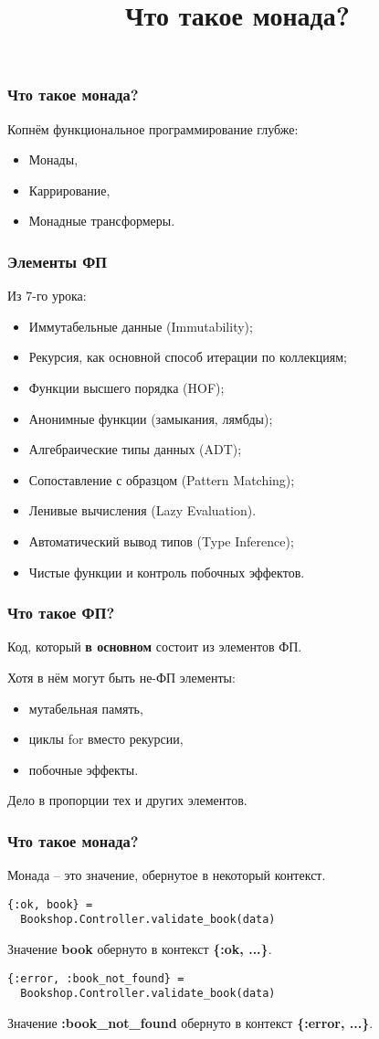 \documentclass[10pt]{beamer}
\title{Что такое монада?}
\begin{document}
\begin{frame}
  \frametitle{Что такое монада?}
  Копнём функциональное программирование глубже:
  \par \bigskip
  \begin{itemize}
  \item Монады,
  \item Каррирование,
  \item Монадные трансформеры.
  \end{itemize}
\end{frame}

\begin{frame}
  \frametitle{Элементы ФП}
  Из 7-го урока:
  \par \bigskip
  \begin{itemize}
  \item Иммутабельные данные (Immutability);
  \item Рекурсия, как основной способ итерации по коллекциям;
  \item Функции высшего порядка (HOF);
  \item Анонимные функции (замыкания, лямбды);
  \item Алгебраические типы данных (ADT);
  \item Сопоставление с образцом (Pattern Matching);
  \item Ленивые вычисления (Lazy Evaluation).
  \item Автоматический вывод типов (Type Inference);
  \item Чистые функции и контроль побочных эффектов.
  \end{itemize}
\end{frame}

\begin{frame}
  \frametitle{Что такое ФП?}
  Код, который \textbf{в основном} состоит из элементов ФП.
  \par \bigskip
  Хотя в нём могут быть не-ФП элементы:
  \begin{itemize}
  \item мутабельная память,
  \item циклы for вместо рекурсии,
  \item побочные эффекты.
  \end{itemize}
  \par \bigskip
  Дело в пропорции тех и других элементов.
\end{frame}

\begin{frame}[fragile]
  \frametitle{Что такое монада?}
  Монада -- это значение, обернутое в некоторый контекст.
  \par \bigskip
  \begin{lstlisting}
{:ok, book} =
  Bookshop.Controller.validate_book(data)
  \end{lstlisting}
  Значение \textbf{book} обернуто в контекст \textbf{\{:ok, ...\}}.
  \par \bigskip
  \begin{lstlisting}
{:error, :book_not_found} =
  Bookshop.Controller.validate_book(data)
  \end{lstlisting}
  Значение \textbf{:book\_not\_found} обернуто в контекст \textbf{\{:error, ...\}}.
\end{frame}
\end{document}
